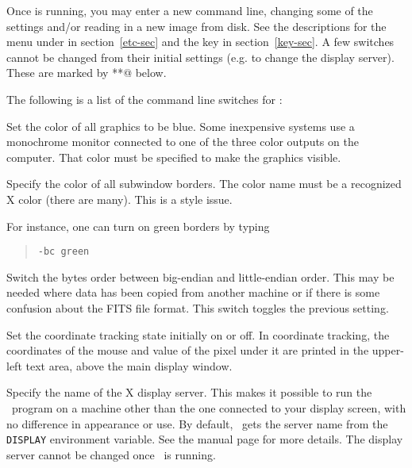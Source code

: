 Once {\SAO} is running, you may enter a new command line, changing
some of the settings and/or reading in a new image from disk.
See the descriptions for the  menu under  in
section~\ref{etc-sec} and the  key in section~\ref{key-sec}.
A few switches cannot be changed from their initial settings
(e.g.  to change the display server).
These are marked by \verb@**@ below.

The following is a list of the command line switches for {\SAO}:

\begin{description}


Set the color of all graphics to be blue.
Some inexpensive systems use a monochrome monitor connected to
one of the three color outputs on the computer.  That color must
be specified to make the graphics visible.


Specify the color of all subwindow borders.  The color name must be a
recognized X color (there are many).  This is a style issue.

For instance, one can turn on green borders by typing
\begin{quote}
\verb"-bc green"
\end{quote}


Switch the bytes order between big-endian and little-endian
order.  This may be needed where data has been copied from
another machine or if there is some confusion about the FITS
file format.  This switch toggles the previous setting.


Set the coordinate tracking state initially on or off.  In coordinate
tracking, the coordinates of the mouse and value of the pixel under it
are printed in the upper-left text area, above the main display window.


Specify the name of the X display server.  This makes it
possible to run the \SAO\ program on a machine other than
the one connected to your display screen, with no difference
in appearance or use.  By default, \SAO\ gets the server name from
the \verb"DISPLAY" environment variable.  See the  manual page
for more details.  The display server cannot be changed once
\SAO\ is running.


\end{description}
